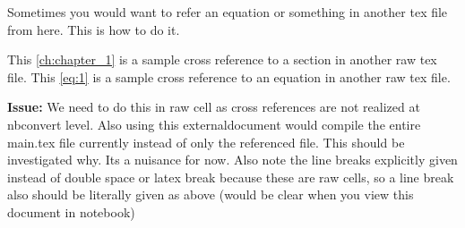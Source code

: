 \documentclass[float=false,crop=false]{standalone}
\begin{document}
Sometimes you would want to refer an equation or something in another
tex file from here. This is how to do it.

This \ref{ch:chapter_1} is a sample cross reference to a section in another raw tex file. 
This \ref{eq:1} is a sample cross reference to an equation in another raw tex file.

    \textbf{Issue:} We need to do this in raw cell as cross references are
not realized at nbconvert level. Also using this externaldocument would
compile the entire main.tex file currently instead of only the
referenced file. This should be investigated why. Its a nuisance for
now. Also note the line breaks explicitly given instead of double space
or latex break because these are raw cells, so a line break also should
be literally given as above (would be clear when you view this document
in notebook)


    
    
    
    
\end{document}

